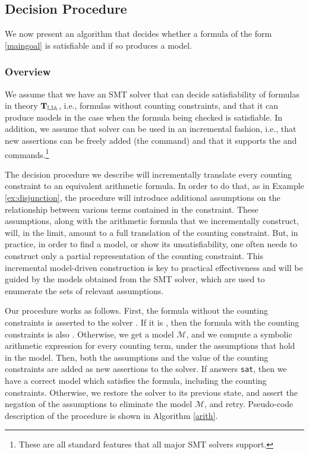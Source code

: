 \subsection{Decision Procedure}

We now present an algorithm that decides whether a formula of the form
\ref{maingoal} is satisfiable and if so produces a model.

\subsubsection{Overview}

We assume that we have an SMT solver \solver that can decide
satisfiability of formulas in theory $\operatorname{\mathbf{T}_{\mathbb{LIA}}}$, i.e., formulas without
counting constraints, and that it can produce models in the case when
the formula being checked is satisfiable. In addition, we assume that
solver \solver can be used in an incremental fashion, i.e., that new
assertions can be freely added (the \assert command) and that it
supports the \push and \pop commands.\footnote{These are all standard
features that all major SMT solvers support.}

The decision procedure we describe will incrementally translate every
counting constraint to an equivalent arithmetic formula. In order to
do that, as in Example \ref{ex:disjunction}, the procedure will
introduce additional assumptions on the relationship between various
terms contained in the constraint. These assumptions, along with the
arithmetic formula that we incrementally construct, will, in the
limit, amount to a full translation of the counting constraint. But,
in practice, in order to find a model, or show its unsatisfiability,
one often needs to construct only a partial representation of the
counting constraint. This incremental model-driven construction is key
to practical effectiveness and will be guided by the models obtained
from the SMT solver, which are used to enumerate the sets of relevant
assumptions.

Our procedure works as follows. First, the formula without the
counting constraints is asserted to the solver \solver. If it is
\unsat, then the formula with the counting constraints is also
\sat. Otherwise, we get a model $\mathcal{M}$, and we
compute a symbolic arithmetic expression for every counting term,
under the assumptions that hold in the model. Then, both the
assumptions and the value of the counting constraints are added as new
assertions to the solver. If \solver answers \texttt{sat}, then we
have a correct model which satisfies the formula, including the
counting constraints. Otherwise, we restore the solver to its previous
state, and assert the negation of the assumptions to eliminate the
model $\mathcal{M}$, and retry. Pseudo-code description of the
procedure is shown in Algorithm \ref{arith}.

